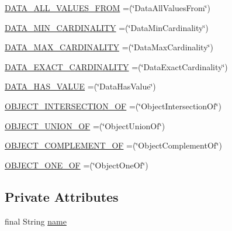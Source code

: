 \begin{DoxyCompactItemize}
\item 
\hyperlink{enumorg_1_1semanticweb_1_1owlapi_1_1model_1_1_class_expression_type_a29357a05aaa60bc57d6a47b9bfe8446a}{D\-A\-T\-A\-\_\-\-A\-L\-L\-\_\-\-V\-A\-L\-U\-E\-S\-\_\-\-F\-R\-O\-M} =(\char`\"{}Data\-All\-Values\-From\char`\"{})
\item 
\hyperlink{enumorg_1_1semanticweb_1_1owlapi_1_1model_1_1_class_expression_type_ab7719203544b2dcd360c4ec0584adfe9}{D\-A\-T\-A\-\_\-\-M\-I\-N\-\_\-\-C\-A\-R\-D\-I\-N\-A\-L\-I\-T\-Y} =(\char`\"{}Data\-Min\-Cardinality\char`\"{})
\item 
\hyperlink{enumorg_1_1semanticweb_1_1owlapi_1_1model_1_1_class_expression_type_a56f7f5e8df54c8fcabd820421d92d5d3}{D\-A\-T\-A\-\_\-\-M\-A\-X\-\_\-\-C\-A\-R\-D\-I\-N\-A\-L\-I\-T\-Y} =(\char`\"{}Data\-Max\-Cardinality\char`\"{})
\item 
\hyperlink{enumorg_1_1semanticweb_1_1owlapi_1_1model_1_1_class_expression_type_a139a470d0271be81e4d0a3917beb0a72}{D\-A\-T\-A\-\_\-\-E\-X\-A\-C\-T\-\_\-\-C\-A\-R\-D\-I\-N\-A\-L\-I\-T\-Y} =(\char`\"{}Data\-Exact\-Cardinality\char`\"{})
\item 
\hyperlink{enumorg_1_1semanticweb_1_1owlapi_1_1model_1_1_class_expression_type_a00e39d8a201e4a37f68a4dae2cfd1524}{D\-A\-T\-A\-\_\-\-H\-A\-S\-\_\-\-V\-A\-L\-U\-E} =(\char`\"{}Data\-Has\-Value\char`\"{})
\item 
\hyperlink{enumorg_1_1semanticweb_1_1owlapi_1_1model_1_1_class_expression_type_a3cee0e9262998efd7bb60035fd5b9b20}{O\-B\-J\-E\-C\-T\-\_\-\-I\-N\-T\-E\-R\-S\-E\-C\-T\-I\-O\-N\-\_\-\-O\-F} =(\char`\"{}Object\-Intersection\-Of\char`\"{})
\item 
\hyperlink{enumorg_1_1semanticweb_1_1owlapi_1_1model_1_1_class_expression_type_a90b3bb2ffc027f060ea9e51a830bd904}{O\-B\-J\-E\-C\-T\-\_\-\-U\-N\-I\-O\-N\-\_\-\-O\-F} =(\char`\"{}Object\-Union\-Of\char`\"{})
\item 
\hyperlink{enumorg_1_1semanticweb_1_1owlapi_1_1model_1_1_class_expression_type_a51e956acab74128b82868a22ad4358fd}{O\-B\-J\-E\-C\-T\-\_\-\-C\-O\-M\-P\-L\-E\-M\-E\-N\-T\-\_\-\-O\-F} =(\char`\"{}Object\-Complement\-Of\char`\"{})
\item 
\hyperlink{enumorg_1_1semanticweb_1_1owlapi_1_1model_1_1_class_expression_type_a82622300f5c8a630e7cae6dd5f300d25}{O\-B\-J\-E\-C\-T\-\_\-\-O\-N\-E\-\_\-\-O\-F} =(\char`\"{}Object\-One\-Of\char`\"{})
\end{DoxyCompactItemize}
\subsection*{Private Attributes}
\begin{DoxyCompactItemize}
\item 
final String \hyperlink{enumorg_1_1semanticweb_1_1owlapi_1_1model_1_1_class_expression_type_a1900aae805cc71bf29700bb22df386a6}{name}
\end{DoxyCompactItemize}


